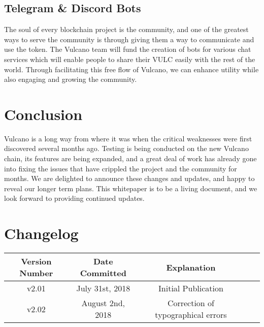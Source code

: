\documentclass[A4paper, 12pt]{article}
\begin{document}
\subsection{Telegram \& Discord Bots}
The soul of every blockchain project is the community, and one of the greatest ways to serve the community is through giving them a way to communicate and use the token. The Vulcano team will fund the creation of bots for various chat services which will enable people to share their VULC easily with the rest of the world. Through facilitating this free flow of Vulcano, we can enhance utility while also engaging and growing the community.

\section{Conclusion}
Vulcano is a long way from where it was when the critical weaknesses were first discovered several months ago. Testing is being conducted on the new Vulcano chain, its features are being expanded, and a great deal of work has already gone into fixing the issues that have crippled the project and the community for months. We are delighted to announce these changes and updates, and happy to reveal our longer term plans. This whitepaper is to be a living document, and we look forward to providing continued updates. 
\newpage
\section{Changelog}

\begin{table}[h]
\centering
\begin{tabular}{@{}ccccc@{}}
\toprule
Version Number & Date Committed & Explanation \\ \midrule
v2.01 & July 31st, 2018 & Initial Publication \\
v2.02 & August 2nd, 2018 & Correction of typographical errors \\
 \bottomrule
\end{tabular}
\end{table}
\end{document}

